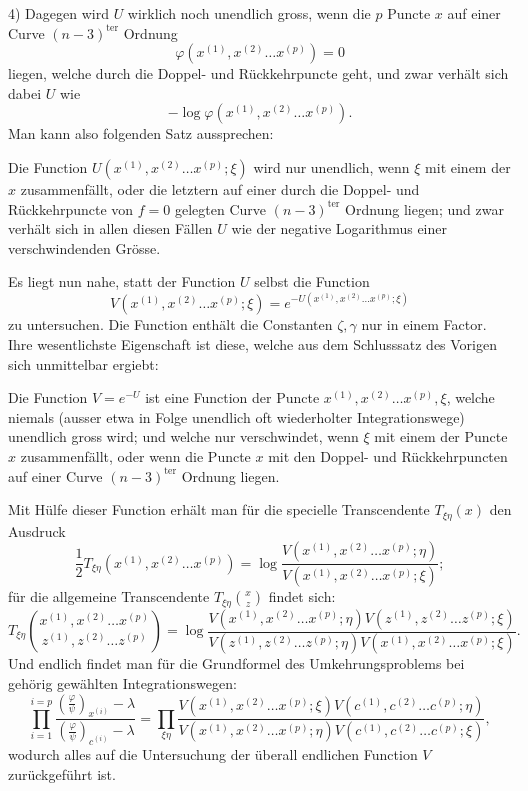 \documentclass[10pt]{article}
\begin{document}
4) Dagegen wird \(U\) wirklich noch unendlich gross, wenn die \(p\) Puncte \(x\) auf einer Curve \((n-3)^{\mathrm{ter}}\) Ordnung
\[
\varphi(x^{(1)},x^{(2)}\ldots x^{(p)})=0
\]
liegen, welche durch die Doppel- und Rückkehrpuncte geht, und zwar verhält sich dabei \(U\) wie
\[
-\log\varphi(x^{(1)},x^{(2)}\ldots x^{(p)}).
\]
Man kann also folgenden Satz aussprechen:

Die Function \(U(x^{(1)},x^{(2)}\ldots x^{(p)};\xi)\) wird nur unendlich, wenn \(\xi\) mit einem der \(x\) zusammenfällt, oder die letztern auf einer durch die Doppel- und Rückkehrpuncte von \(f=0\) gelegten Curve \((n-3)^{\mathrm{ter}}\) Ordnung liegen; und zwar verhält sich in allen diesen Fällen \(U\) wie der negative Logarithmus einer verschwindenden Grösse.

Es liegt nun nahe, statt der Function \(U\) selbst die Function
\[
V(x^{(1)},x^{(2)}\ldots x^{(p)};\xi)=e^{-U(x^{(1)},x^{(2)}\ldots x^{(p)};\xi)}
\]
zu untersuchen. Die Function enthält die Constanten \(\zeta,\gamma\) nur in einem Factor. Ihre wesentlichste Eigenschaft ist diese, welche aus dem Schlusssatz des Vorigen sich unmittelbar ergiebt:

Die Function \(V=e^{-U}\) ist eine Function der Puncte \(x^{(1)},x^{(2)}\ldots x^{(p)},\xi\), welche niemals (ausser etwa in Folge unendlich oft wiederholter Integrationswege) unendlich gross wird; und welche nur verschwindet, wenn \(\xi\) mit einem der Puncte \(x\) zusammenfällt, oder wenn die Puncte \(x\) mit den Doppel- und Rückkehrpuncten auf einer Curve \((n-3)^{\mathrm{ter}}\) Ordnung liegen.

Mit Hülfe dieser Function erhält man für die specielle Transcendente \(T_{\xi\eta}(x)\) den Ausdruck
\[
\frac12T_{\xi\eta}(x^{(1)},x^{(2)}\ldots x^{(p)})
=\log\frac{V(x^{(1)},x^{(2)}\ldots x^{(p)};\eta)}{V(x^{(1)},x^{(2)}\ldots x^{(p)};\xi)};
\]
für die allgemeine Transcendente \(T_{\xi\eta}\binom{x}{z}\) findet sich:
\[
T_{\xi\eta}\binom{x^{(1)},x^{(2)}\ldots x^{(p)}}{z^{(1)},z^{(2)}\ldots z^{(p)}}
=\log\frac{V(x^{(1)},x^{(2)}\ldots x^{(p)};\eta)V(z^{(1)},z^{(2)}\ldots z^{(p)};\xi)}{V(z^{(1)},z^{(2)}\ldots z^{(p)};\eta)V(x^{(1)},x^{(2)}\ldots x^{(p)};\xi)}.
\]
Und endlich findet man für die Grundformel des Umkehrungsproblems bei gehörig gewählten Integrationswegen:
\begingroup\small
\[
\prod_{i=1}^{i=p}\frac{\left(\frac{\varphi}{\psi}\right)_{x^{(i)}}-\lambda}{\left(\frac{\varphi}{\psi}\right)_{c^{(i)}}-\lambda}
=\prod_{\xi\eta}\frac{V(x^{(1)},x^{(2)}\ldots x^{(p)};\xi)V(c^{(1)},c^{(2)}\ldots c^{(p)};\eta)}{V(x^{(1)},x^{(2)}\ldots x^{(p)};\eta)V(c^{(1)},c^{(2)}\ldots c^{(p)};\xi)},
\]
\endgroup
wodurch alles auf die Untersuchung der überall endlichen Function \(V\) zurückgeführt ist.
\end{document}
